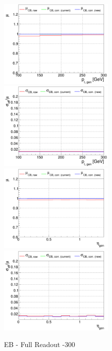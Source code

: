 \begin{figure}
\includegraphics[width=0.495\textwidth]{./plots_pdf/ECAL_plots/plotsPU/EB/FULL/pdf/GENPT/EBFULL_GENPT_0100_0300_MuOverBins.pdf}
\includegraphics[width=0.495\textwidth]{./plots_pdf/ECAL_plots/plotsPU/EB/FULL/pdf/GENPT/EBFULL_GENPT_0100_0300_EffSigmaOverBins.pdf}
\includegraphics[width=0.495\textwidth]{./plots_pdf/ECAL_plots/plotsPU/EB/FULL/pdf/GENETA/EBFULL_GENETA_0100_0300_MuOverBins.pdf}
\includegraphics[width=0.495\textwidth]{./plots_pdf/ECAL_plots/plotsPU/EB/FULL/pdf/GENETA/EBFULL_GENETA_0100_0300_EffSigmaOverBins.pdf}
\caption{EB - Full Readout -300}
\end{figure}




